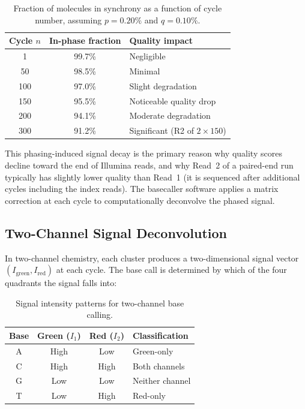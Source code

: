 \begin{table}[htbp]
\centering
\caption[Signal decay due to phasing.]{Fraction of molecules in synchrony as a function of cycle number, assuming $p = 0.20\%$ and $q = 0.10\%$.}
\label{tab:shortread:phasing}
\small
\begin{tabular}{ccl}
\toprule
\textbf{Cycle $n$} & \textbf{In-phase fraction} & \textbf{Quality impact} \\
\midrule
1 & 99.7\% & Negligible \\
50 & 98.5\% & Minimal \\
100 & 97.0\% & Slight degradation \\
150 & 95.5\% & Noticeable quality drop \\
200 & 94.1\% & Moderate degradation \\
300 & 91.2\% & Significant (R2 of $2 \times 150$) \\
\bottomrule
\end{tabular}
\end{table}

This phasing-induced signal decay is the primary reason why quality scores decline toward the end of Illumina reads, and why Read~2 of a paired-end run typically has slightly lower quality than Read~1 (it is sequenced after additional cycles including the index reads). The basecaller software applies a matrix correction at each cycle to computationally deconvolve the phased signal.


\subsection{Two-Channel Signal Deconvolution}
\label{subsec:shortread:signal-deconvolution}

In two-channel chemistry, each cluster produces a two-dimensional signal vector $(I_{\text{green}}, I_{\text{red}})$ at each cycle. The base call is determined by which of the four quadrants the signal falls into:

\begin{table}[htbp]
\centering
\caption[Two-channel base calling scheme.]{Signal intensity patterns for two-channel base calling.}
\label{tab:shortread:twochannel}
\small
\begin{tabular}{cccl}
\toprule
\textbf{Base} & \textbf{Green ($I_1$)} & \textbf{Red ($I_2$)} & \textbf{Classification} \\
\midrule
A & High & Low & Green-only \\
C & High & High & Both channels \\
G & Low & Low & Neither channel \\
T & Low & High & Red-only \\
\bottomrule
\end{tabular}
\end{table}

